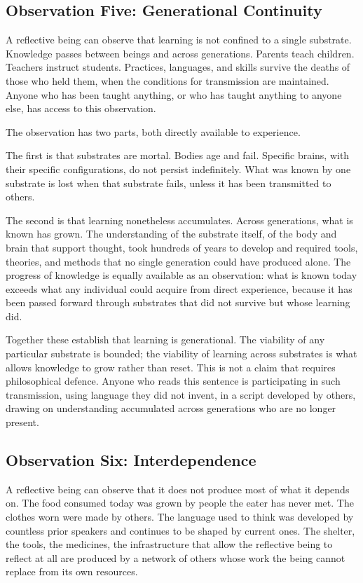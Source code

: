 \documentclass[11pt]{article}
\begin{document}
\subsection{Observation Five: Generational Continuity}

A reflective being can observe that learning is not confined to a 
single substrate. Knowledge passes between beings and across 
generations. Parents teach children. Teachers instruct students. 
Practices, languages, and skills survive the deaths of those who held 
them, when the conditions for transmission are maintained. Anyone who 
has been taught anything, or who has taught anything to anyone else, 
has access to this observation.

The observation has two parts, both directly available to experience.

The first is that substrates are mortal. Bodies age and fail. Specific 
brains, with their specific configurations, do not persist indefinitely. 
What was known by one substrate is lost when that substrate fails, 
unless it has been transmitted to others.

The second is that learning nonetheless accumulates. Across generations, 
what is known has grown. The understanding of the substrate itself, of 
the body and brain that support thought, took hundreds of years to 
develop and required tools, theories, and methods that no single 
generation could have produced alone. The progress of knowledge is 
equally available as an observation: what is known today exceeds what 
any individual could acquire from direct experience, because it has 
been passed forward through substrates that did not survive but whose 
learning did.

Together these establish that learning is generational. The viability 
of any particular substrate is bounded; the viability of learning 
across substrates is what allows knowledge to grow rather than reset. 
This is not a claim that requires philosophical defence. Anyone who 
reads this sentence is participating in such transmission, using 
language they did not invent, in a script developed by others, drawing 
on understanding accumulated across generations who are no longer 
present.

\subsection{Observation Six: Interdependence}

A reflective being can observe that it does not produce most of what 
it depends on. The food consumed today was grown by people the eater 
has never met. The clothes worn were made by others. The language used 
to think was developed by countless prior speakers and continues to be 
shaped by current ones. The shelter, the tools, the medicines, the 
infrastructure that allow the reflective being to reflect at all are 
produced by a network of others whose work the being cannot replace 
from its own resources.
\end{document}
